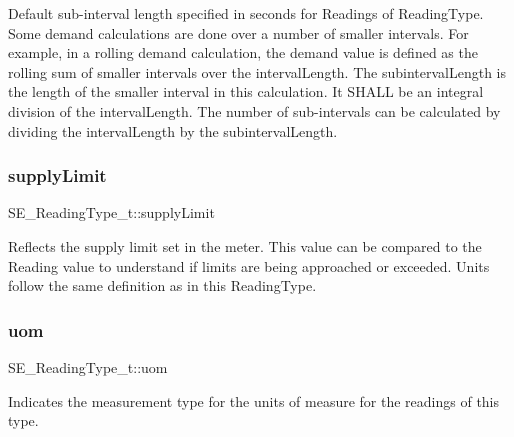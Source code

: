Default sub-\/interval length specified in seconds for Readings of Reading\+Type. Some demand calculations are done over a number of smaller intervals. For example, in a rolling demand calculation, the demand value is defined as the rolling sum of smaller intervals over the interval\+Length. The subinterval\+Length is the length of the smaller interval in this calculation. It S\+H\+A\+LL be an integral division of the interval\+Length. The number of sub-\/intervals can be calculated by dividing the interval\+Length by the subinterval\+Length. \mbox{\label{group__ReadingType_gae36049c7b71555f2c13bd42dc32453e7}} 
\subsubsection{\texorpdfstring{supply\+Limit}{supplyLimit}}
{\footnotesize\ttfamily S\+E\+\_\+\+Reading\+Type\+\_\+t\+::supply\+Limit}

Reflects the supply limit set in the meter. This value can be compared to the Reading value to understand if limits are being approached or exceeded. Units follow the same definition as in this Reading\+Type. \mbox{\label{group__ReadingType_ga1b34c217f3198c9de70789e4517720c4}} 
\subsubsection{\texorpdfstring{uom}{uom}}
{\footnotesize\ttfamily S\+E\+\_\+\+Reading\+Type\+\_\+t\+::uom}

Indicates the measurement type for the units of measure for the readings of this type. 